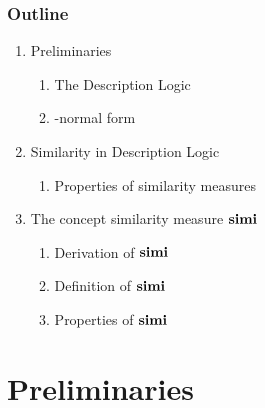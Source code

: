 \documentclass[smaller, dvipsnames]{beamer}
\begin{document}
\begin{frame}
  \frametitle{Outline}
  \begin{enumerate}
    \item Preliminaries
    \begin{enumerate}
      \item The \elh Description Logic
      \item \elh-normal form
    \end{enumerate}
    \item Similarity in Description Logic
    \begin{enumerate}
      \item Properties of similarity measures
    \end{enumerate}
    \item The concept similarity measure \(\operatorname{\mathbf{simi}}\)
    \begin{enumerate}
      \item Derivation of \(\operatorname{\mathbf{simi}}\)
      \item Definition of \(\operatorname{\mathbf{simi}}\)
      \item Properties of \(\operatorname{\mathbf{simi}}\)
    \end{enumerate}
  \end{enumerate}
\end{frame}

\section{Preliminaries}
\end{document}
